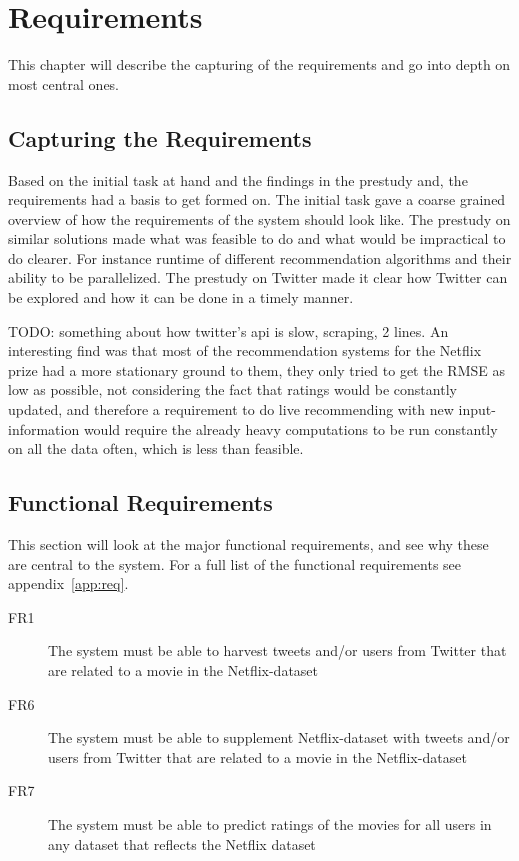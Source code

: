 
\chapter{Requirements}

\minitoc

This chapter will describe the capturing of the requirements and go into depth on most central ones.

\clearpage

\section{Capturing the Requirements}
Based on the initial task at hand and the findings in the prestudy and, the requirements had a basis to get formed on. The initial task gave a coarse grained overview of how the requirements of the system should look like. The prestudy on similar solutions made what was feasible to do and what would be impractical to do clearer. For instance runtime of different recommendation algorithms and their ability to be parallelized. The prestudy on Twitter made it clear how Twitter can be explored and how it can be done in a timely manner.

TODO: something about how twitter's api is slow, scraping, 2 lines.
An interesting find was that most of the recommendation systems for the Netflix prize had a more stationary ground to them, they only tried to get the RMSE as low as possible, not considering the fact that ratings would be constantly updated, and therefore a requirement to do live recommending with new input-information would require the already heavy computations to be run constantly on all the data often, which is less than feasible.


\section{Functional Requirements}\label{section:functional-requirements}
This section will look at the major functional requirements, and see why these are central to the system. For a full list of the functional requirements see appendix~\ref{app:req}.
\begin{description}
  \item[FR1] The system must be able to harvest tweets and/or users from Twitter that are related to a movie in the Netflix-dataset
  \item[FR6] The system must be able to supplement Netflix-dataset with tweets and/or users from Twitter that are related to a movie in the Netflix-dataset
  \item[FR7] The system must be able to predict ratings of the movies for all users in any dataset that reflects the Netflix dataset
\end{description}


